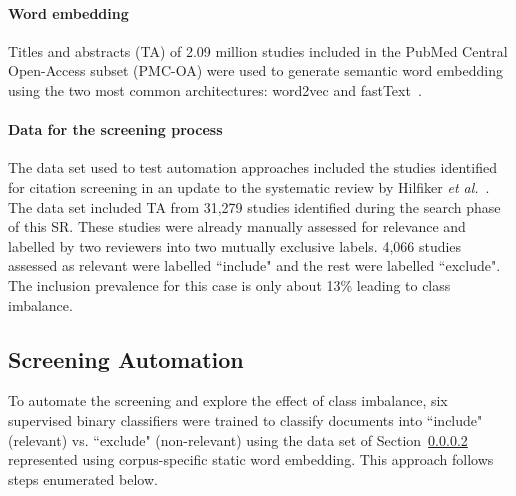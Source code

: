 \documentclass{IOS-Book-Article}
\begin{document}
\paragraph{Word embedding}
\label{method:dataset_embedding}
Titles and abstracts (TA) of 2.09 million studies included in the PubMed Central Open-Access subset (PMC-OA) were used to generate semantic word embedding using the two most common architectures: word2vec and  fastText~\cite{word2vec, bojanowski2017enriching}.
%
\paragraph{Data for the screening process}
\label{sysrev_dataset}
%
The data set used to test automation approaches included the studies identified for citation screening in an update to the systematic review by Hilfiker \textit{et al.}~\cite{Hilfiker651}. %
The data set included TA from 31,279 studies identified during the search phase of this SR.
These studies were already manually assessed for relevance and labelled by two reviewers into two mutually exclusive labels.
4,066 studies assessed as relevant were labelled ``include" and
the rest were labelled ``exclude".
The inclusion prevalence for this case is only about 13\% leading to class imbalance.
%
\subsection{Screening Automation}
%
To automate the screening and explore the effect of class imbalance, six supervised binary classifiers were trained to classify documents into ``include" (relevant) vs. ``exclude" (non-relevant) using the data set of Section~\ref{sysrev_dataset} represented using corpus-specific static word embedding.
This approach follows steps enumerated below.
%
\end{document}
